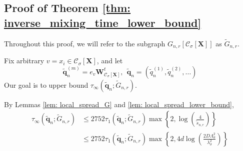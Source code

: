 \documentclass{article}
\newcommand{\1}{\mathbf{1}}
\newcommand{\qbf}{\mathbf{q}}
\newcommand{\Xbf}{\mathbf{X}}
\newcommand{\Wbf}{\mathbf{W}}
\newcommand{\Cset}{\mathcal{C}}
\newcommand{\Csig}{\Cset_{\sigma}}
\theoremstyle{aldenthm}
\begin{document}
\subsection{Proof of Theorem \ref{thm: inverse_mixing_time_lower_bound}}
\label{sec: inverse_mixing_time_lower_bound}
Throughout this proof, we will refer to the subgraph $G_{n,r}\left[\Csig[\Xbf]\right]$ as $\widetilde{G}_{n,r}$. 

Fix arbitrary $v = x_i \in \Csig[\Xbf]$, and let
\begin{equation*}
\widetilde{\qbf}_n^{(m)} = e_v \Wbf_{\Csig[\Xbf]}^t, ~~ \widetilde{\qbf}_n = (\widetilde{q}_n^{(1)}, \widetilde{q}_n^{(2)}, \ldots)
\end{equation*}
Our goal is to upper bound $\tau_{\infty}(\widetilde{\qbf}_n; \widetilde{G}_{n,r})$.

By Lemmas \ref{lem: local_spread_G} and \ref{lem: local_spread_lower_bound},
\begin{align*}
\tau_{\infty}(\widetilde{\qbf}_n; \widetilde{G}_{n,r}) & \leq 2752 \tau_{1}(\widetilde{\qbf}_n; \widetilde{G}_{n,r}) \max\left\{2, \log\left(\frac{4}{\widetilde{s}_{n,r}}\right) \right\} \nonumber \\
& \leq 2752 \tau_{1}(\widetilde{\qbf}_n; \widetilde{G}_{n,r}) \max\left\{2, 4d\log\left(\frac{2D \Lambda_{\sigma}^2}{\lambda_{\sigma}^2}\right) \right\}
\end{align*} 
\end{document}
